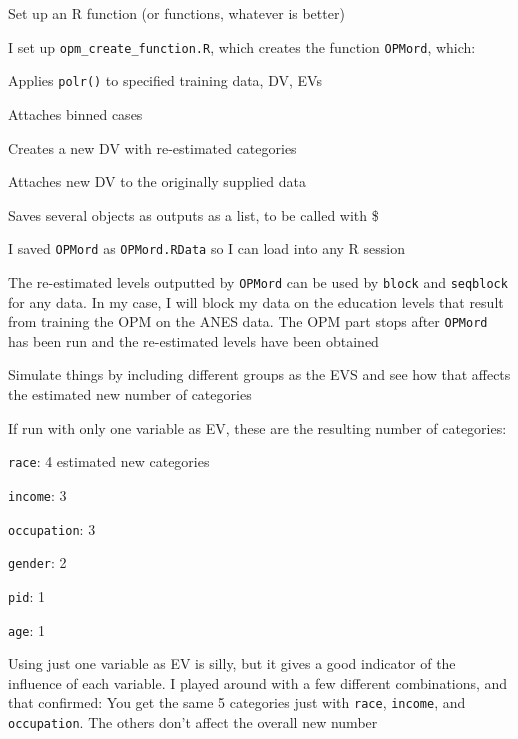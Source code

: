 \documentclass[12pt]{article}
\begin{document}
\begin{coi}
\begin{coi}
\begin{coi}
					\end{coi}
			\end{coi}
		\item Set up an R function (or functions, whatever is better)
			\begin{coi}
				\item I set up \texttt{opm\_create\_function.R}, which creates the function \texttt{OPMord}, which:
						\begin{coi}
							\item Applies \texttt{polr()} to specified training data, DV, EVs
							\item Attaches binned cases
							\item Creates a new DV with re-estimated categories
							\item Attaches new DV to the originally supplied data
							\item Saves several objects as outputs as a list, to be called with \$
						\end{coi}
				\item I saved \texttt{OPMord} as \texttt{OPMord.RData} so I can load into any R session
				\item The re-estimated levels outputted by \texttt{OPMord} can be used by \texttt{block} and \texttt{seqblock} for any data. In my case, I will block my data on the education levels that result from training the OPM on the ANES data. The OPM part stops after \texttt{OPMord} has been run and the re-estimated levels have been obtained
			\end{coi}
		\item Simulate things by including different groups as the EVS and see how that affects the estimated new number of categories
			\begin{coi}
				\item If run with only one variable as EV, these are the resulting number of categories:
					\begin{coi}
						\item \texttt{race}: 4 estimated new categories
						\item \texttt{income}: 3
						\item \texttt{occupation}: 3
						\item \texttt{gender}: 2
						\item \texttt{pid}: 1
						\item \texttt{age}: 1
					\end{coi}
				\item Using just one variable as EV is silly, but it gives a good indicator of the influence of each variable. I played around with a few different combinations, and that confirmed: You get the same 5 categories just with \texttt{race}, \texttt{income}, and \texttt{occupation}. The others don't affect the overall new number

\end{coi}
\end{coi}
\end{document}
